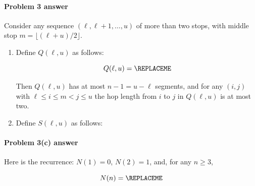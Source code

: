 \paragraph{Problem 3 answer} 

Consider any sequence $(\ell, \ell+1, \ldots, u)$ of more than two stops,
with middle stop $m=\lfloor (\ell+u)/2\rfloor$.

\begin{enumerate}[label=(\alph*)]

\item %
  Define $Q(\ell, u)$ as follows:
  \begin{blue}
    \[
      Q(\ell, u)
      =
      \REPLACEME
    \]

  \end{blue}

  Then $Q(\ell, u)$ has at most $n-1 = u-\ell$ segments,
  and for any $(i, j)$ with $\ell \le i \le m < j \le u$
  the hop length from $i$ to $j$ in $Q(\ell, u)$ is at most two.

\item %
  Define $S(\ell, u)$ as follows:
  \BLUE{
    \[
      S(\ell, u) = \REPLACEME
    \]
  }
\end{enumerate}

\continued 
\setlength{\ITEMHT}{1in}

\paragraph{Problem 3(c) answer} 

Here is the recurrence:  $N(1) = 0$, $N(2) = 1$, and, for any $n\ge 3$,

\begin{blue}
  \[
    N(n) = \REPLACEME
  \]
\end{blue}

